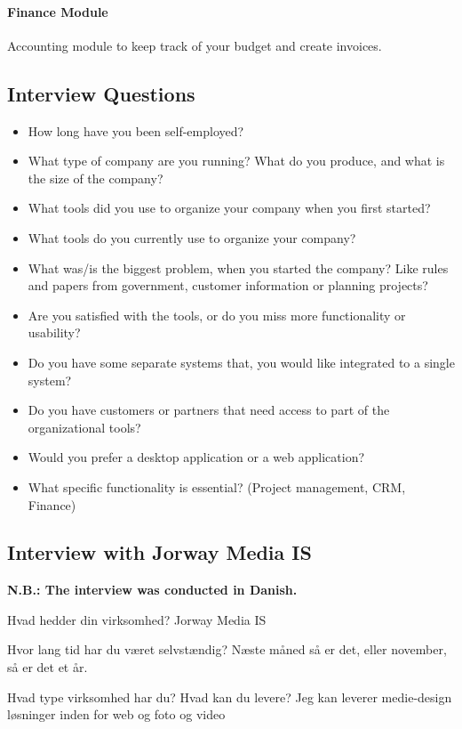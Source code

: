 \paragraph{Finance Module}
Accounting module to keep track of your budget and create invoices.

\subsection{Interview Questions}
\begin{itemize}
  \setlength\itemsep{0em}
  \item How long have you been self-employed?
  \item What type of company are you running? What do you produce, and what is the size of the company? 
  \item What tools did you use to organize your company when you first started?
  \item What tools do you currently use to organize your company?
  \item What was/is the biggest problem, when you started the company? Like rules and papers from government, customer information or planning projects?
  \item Are you satisfied with the tools, or do you miss more functionality or usability?
  \item Do you have some separate systems that, you would like integrated to a single system?
  \item Do you have customers or partners that need access to part of the organizational tools?
  \item Would you prefer a desktop application or a web application?
  \item What specific functionality is essential? (Project management, CRM, Finance)
\end{itemize}

\subsection{Interview with Jorway Media IS}
\textbf{N.B.: The interview was conducted in Danish.}

Hvad hedder din virksomhed?
Jorway Media IS

Hvor lang tid har du været selvstændig?
Næste måned så er det, eller november, så er det et år.

Hvad type virksomhed har du? Hvad kan du levere?
Jeg kan leverer medie-design løsninger inden for web og foto og video

